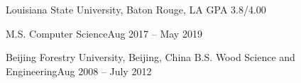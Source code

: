 \documentclass[10pt,a4paper]{article}
\begin{document}


\spacedhrule{0em}{-1em}

%
%


\headedsection
{Louisiana State University, Baton Rouge, LA}
{GPA 3.8/4.00}{

  \headedsubsection
  {M.S. Computer Science}{Aug 2017
    -- May 2019}{}
}
\vspace{0.1em}
\headedsection
{Beijing Forestry University, Beijing, China}{
	\headedsubsection
  {B.S. Wood Science and Engineering}{Aug 2008 -- July 2012}{}
}
\end{document}
